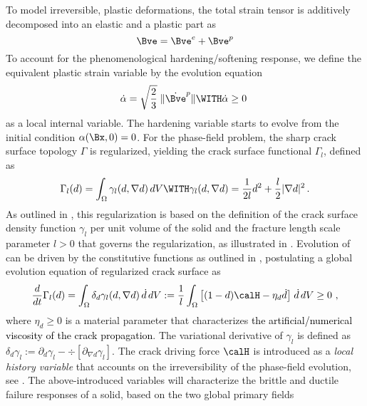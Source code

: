 \documentclass[final,3p,times]{elsarticle}
\begin{document}
To model irreversible, plastic deformations, the total strain tensor is additively decomposed into an elastic and a plastic part as
\begin{equation}
\Bve = \Bve^e + \Bve^p
\end{equation}
To account for the phenomenological hardening/softening response, we define the equivalent plastic strain variable by the evolution equation
%
\begin{equation}
\dot\alpha = \sqrt{\frac{2}{3}} \; \| \dot\Bve^p \|
\WITH
\dot\alpha \ge 0
\ 
\label{evol-alpha}
\end{equation}
%
as a local internal variable. The hardening variable starts to evolve from the initial condition $\alpha(\Bx,0) = 0$. For the phase-field problem, the sharp crack surface topology $\Gamma$ is regularized, yielding the crack surface functional $\Gamma_l$, defined as
%
\begin{equation}
\Gamma_l(d) = \int_{\Omega} \gamma_l(d, \nabla d) \, dV
\WITH
\gamma_l(d, \nabla d) =  
\dfrac{1}{2l} d^2 + \dfrac{l}{2} \vert \nabla d \vert^2 \,.
\label{gamma_l}
\end{equation}
%
As outlined in \cite{miehe+hofacker+schaenzel+aldakheel15}, this regularization is based on the definition of the crack surface density function $\gamma_l$ per unit volume of the solid and the fracture length scale parameter $l>0$ that governs the regularization, as illustrated in . 
%
Evolution of  can be driven by the constitutive
functions as outlined in \cite{aldakheel16,aldakheel+wriggers+miehe17}, postulating a global evolution equation of regularized crack surface as
\begin{equation}
\vphantom{\int_{\Omega}}
\frac{d}{dt} \Gamma_l(d) =
\int_{\Omega} {\delta_d}
\gamma_l(d,\nabla d) \, \dot d \, dV := 
\frac{1}{l} \int_{\Omega} \big[ (1-d) \calH - \eta_d \dot{d} \big]\;
\dot{d} \, dV \ge 0 \ ,
\label{gamma-evol}
\end{equation}
where $\eta_d \ge 0$ is a material parameter that characterizes 
\textcolor{black}{the artificial/numerical viscosity of the crack propagation}. The variational derivative of $\gamma_l$ is defined as $\delta_d \gamma_l := \partial_d \gamma_l - \div [\partial_{\nabla d} \gamma_l] $. The crack driving force
$\calH$ is introduced as a {\it local history variable} that accounts on the irreversibility of the phase-field evolution, see \cite{miehe+aldakheel+raina16}. 
\newline
\newline
The above-introduced variables will characterize the brittle and ductile failure responses of a solid, based on the two  global primary fields
\end{document}
